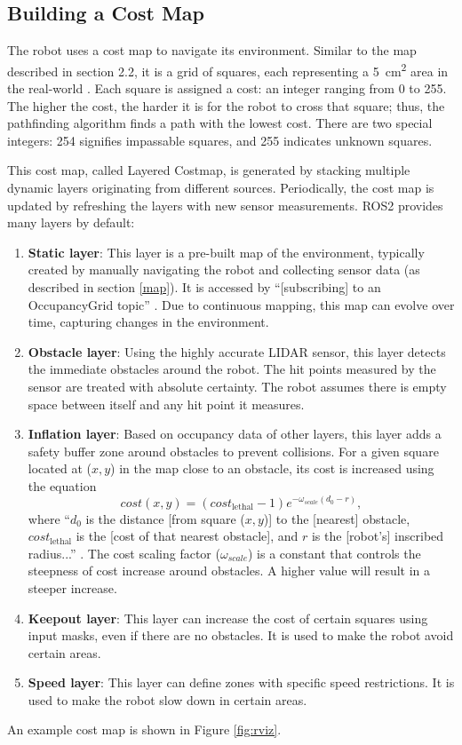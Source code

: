 \subsection{Building a Cost Map} \label{cost-map}
The robot uses a cost map to navigate its environment. Similar to the map described in section 2.2, it is a grid of squares, each representing a \qty{5}{cm^2} area in the real-world \parencite{macenskiDesksROSMaintainers2023}. Each square is assigned a cost: an integer ranging from 0 to 255. The higher the cost, the harder it is for the robot to cross that square; thus, the pathfinding algorithm finds a path with the lowest cost. There are two special integers: 254 signifies impassable squares, and 255 indicates unknown squares.

This cost map, called Layered Costmap, is generated by stacking multiple dynamic layers originating from different sources. Periodically, the cost map is updated by refreshing the layers with new sensor measurements. ROS2 provides many layers by default:
\begin{enumerate}
    \item \textbf{Static layer}: This layer is a pre-built map of the environment, typically created by manually navigating the robot and collecting sensor data (as described in section \ref{map}). It is accessed by ``[subscribing] to an OccupancyGrid topic'' \parencite{macenskiDesksROSMaintainers2023}. Due to continuous mapping, this map can evolve over time, capturing changes in the environment.
    \item \textbf{Obstacle layer}: Using the highly accurate LIDAR sensor, this layer detects the immediate obstacles around the robot. The hit points measured by the sensor are treated with absolute certainty. The robot assumes there is empty space between itself and any hit point it measures.
    \item \textbf{Inflation layer}: Based on occupancy data of other layers, this layer adds a safety buffer zone around obstacles to prevent collisions. For a given square located at ($x,y$) in the map close to an obstacle, its cost is increased using the equation
          \[
              cost(x,y)=(cost_\text{lethal}-1)e^{-\omega_{scale}(d_0-r)},
          \]
          where ``$d_0$ is the distance [from square ($x,y$)] to the [nearest] obstacle, $cost_\text{lethal}$ is the [cost of that nearest obstacle], and $r$ is the [robot's] inscribed radius...'' \parencite{macenskiDesksROSMaintainers2023}. The cost scaling factor ($\omega_{scale}$) is a constant that controls the steepness of cost increase around obstacles. A higher value will result in a steeper increase.
    \item \textbf{Keepout layer}: This layer can increase the cost of certain squares using input masks, even if there are no obstacles. It is used to make the robot avoid certain areas.
    \item \textbf{Speed layer}: This layer can define zones with specific speed restrictions. It is used to make the robot slow down in certain areas.
\end{enumerate}
An example cost map is shown in Figure \ref{fig:rviz}.

